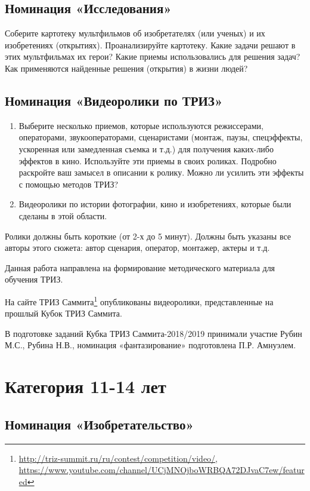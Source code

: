 \documentclass[11pt,a4paper]{article}
\newcommand{\video}{Ролики должны быть короткие (от 2-х до 5 минут). Должны
  быть указаны все авторы этого сюжета: автор сценария, оператор, монтажер,
  актеры и т.д.

Данная работа направлена на формирование методического материала для обучения
ТРИЗ.

На сайте ТРИЗ
Саммита\footnote{\url{http://triz-summit.ru/ru/contest/competition/video/},\\
  \url{https://www.youtube.com/channel/UCjMNOjboWRBQA72DJvaC7ew/featured}}
опубликованы видеоролики, представленные на прошлый Кубок ТРИЗ Саммита.}
\newcommand{\credentials}{В подготовке заданий Кубка ТРИЗ Саммита-2018/2019
  принимали участие Рубин М.С., Рубина Н.В., номинация «фантазирование»
  подготовлена П.Р. Амнуэлем.}
\begin{document}
\subsection*{Номинация «Исследования»}
Соберите картотеку мультфильмов об изобретателях (или ученых) и их
изобретениях (открытиях). Проанализируйте картотеку. Какие задачи решают в
этих мультфильмах их герои? Какие приемы использовались для решения задач? Как
применяются найденные решения (открытия) в жизни людей?

\subsection*{Номинация «Видеоролики по ТРИЗ»}
\begin{enumerate}
\item Выберите несколько приемов, которые используются режиссерами,
  операторами, звукооператорами, сценаристами (монтаж, паузы, спецэффекты,
  ускоренная или замедленная съемка и т.д.) для получения каких-либо эффектов
  в кино. Используйте эти приемы в своих роликах. Подробно раскройте ваш
  замысел в описании к ролику. Можно ли усилить эти эффекты с помощью методов
  ТРИЗ?
\item Видеоролики по истории фотографии, кино и изобретениях, которые были
  сделаны в этой области.
\end{enumerate}
\video\par\credentials

\clearpage
\section*{Категория 11-14 лет}

\subsection*{Номинация «Изобретательство»}
\end{document}
